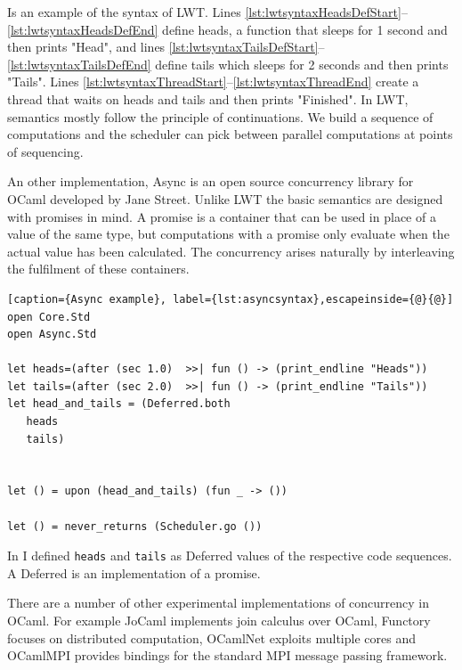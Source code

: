 \documentclass[12pt,twoside,notitlepage]{report}
\begin{document}
Is  an example of the syntax of LWT. Lines \ref{lst:lwtsyntaxHeadsDefStart}--\ref{lst:lwtsyntaxHeadsDefEnd} define heads, a function that sleeps for 1 second and then prints "Head", and lines \ref{lst:lwtsyntaxTailsDefStart}--\ref{lst:lwtsyntaxTailsDefEnd} define tails which sleeps for 2 seconds and then prints "Tails".  Lines \ref{lst:lwtsyntaxThreadStart}--\ref{lst:lwtsyntaxThreadEnd} create a thread that waits on heads and tails and then prints "Finished".  In LWT, semantics mostly follow the principle of continuations. We build a sequence of computations and the scheduler can pick between parallel computations at points of sequencing.

An other implementation, Async is an open source concurrency library for OCaml developed by Jane Street. Unlike LWT the basic semantics are designed with promises in mind. A promise is a container that can be used in place of a value of the same type, but computations with a promise only evaluate when the actual value has been calculated. The concurrency arises naturally by interleaving the fulfilment of these containers. 


\begin{minipage}{\linewidth}

\begin{lstlisting}[caption={Async example}, label={lst:asyncsyntax},escapeinside={@}{@}]
open Core.Std
open Async.Std

let heads=(after (sec 1.0)  >>| fun () -> (print_endline "Heads"))
let tails=(after (sec 2.0)  >>| fun () -> (print_endline "Tails"))
let head_and_tails = (Deferred.both
   heads
   tails)


let () = upon (head_and_tails) (fun _ -> ())
  
let () = never_returns (Scheduler.go ())
\end{lstlisting}

\end{minipage}



In  I defined \verb|heads| and \verb|tails| as Deferred values of the respective code sequences. A Deferred is an implementation of a promise.


There are a number of other experimental implementations of concurrency in OCaml. For example JoCaml\cite{jocaml} implements join calculus over OCaml, Functory\cite{functory} focuses on distributed computation, OCamlNet exploits multiple cores and OCamlMPI\cite{ocamlmpi} provides bindings for the standard MPI message passing framework.
\end{document}
